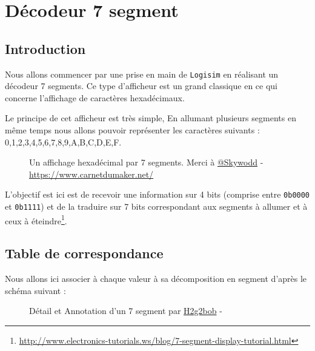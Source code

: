 \documentclass{article}
\begin{document}
    \section{Décodeur 7 segment}

    \subsection{Introduction}

    Nous allons commencer par une prise en main de \texttt{Logisim} en réalisant un décodeur 7 segments.
    Ce type d'afficheur est un grand classique en ce qui concerne l'affichage de caractères hexadécimaux.

    Le principe de cet afficheur est très simple, En allumant plusieurs segments en même temps nous allons pouvoir représenter les caractères suivants :
    0,1,2,3,4,5,6,7,8,9,A,B,C,D,E,F.

    \begin{figure}[H]
        \caption{Un affichage hexadécimal par 7 segments. Merci à \href{https://twitter.com/skywodd}{@Skywodd} - \url{https://www.carnetdumaker.net/}}
    \end{figure}

    L'objectif est ici est de recevoir une information sur 4 bits (comprise entre \texttt{0b0000} et \texttt{0b1111}) et de la traduire sur 7 bits correspondant aux segments à allumer et à ceux à éteindre\footnote{\url{http://www.electronics-tutorials.ws/blog/7-segment-display-tutorial.html}}.

    \subsection{Table de correspondance}
    Nous allons ici associer à chaque valeur à sa décomposition en segment d'après le schéma suivant :
    \begin{figure}[H]
        \caption{Détail et Annotation d'un 7 segment par \href{https://commons.wikimedia.org/wiki/User:H2g2bob}{H2g2bob} - \ccLogo\ccAttribution\ccShareAlike}
    \end{figure}
\end{document}
